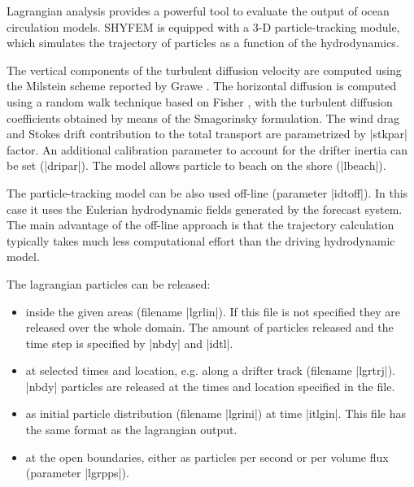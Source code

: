 
%
%
%
%
%
%
%

Lagrangian analysis provides a powerful tool to evaluate the output
of ocean circulation models. SHYFEM is equipped with a 3-D 
particle-tracking module, which simulates the trajectory of 
particles as a function of the hydrodynamics. 

The vertical components of the turbulent diffusion velocity are
computed using the Milstein scheme reported by Grawe 
\cite{Grawe2010}. The horizontal diffusion is computed using a 
random walk technique based on Fisher \cite{Fisher1979}, with the 
turbulent diffusion coefficients obtained by means of the 
Smagorinsky \cite{Smagorinsky1993} formulation. The wind drag 
and Stokes drift contribution to the total transport are parametrized
by |stkpar| factor. An additional calibration parameter to account
for the drifter inertia can be set (|dripar|). The model allows
particle to beach on the shore (|lbeach|). 

The particle-tracking model can be also used off-line (parameter
|idtoff|). In this case it uses the Eulerian hydrodynamic fields 
generated by the forecast system. The main advantage of the 
off-line approach is that the trajectory calculation typically 
takes much less computational effort than the driving hydrodynamic 
model.

The lagrangian particles can be released:
\begin{itemize}
\item inside the given areas (filename |lgrlin|). If this file is not 
      specified they are released over the whole domain. The amount of
      particles released and the time step is specified by |nbdy| and 
      |idtl|.
\item at selected times and location, e.g. along a drifter track
      (filename |lgrtrj|). |nbdy| particles are released at the times
      and location specified in the file.
\item as initial particle distribution (filename |lgrini|) at time
      |itlgin|. This file has the same format as the lagrangian output.
\item at the open boundaries, either as particles per second or per
      volume flux (parameter |lgrpps|).
\end{itemize}

